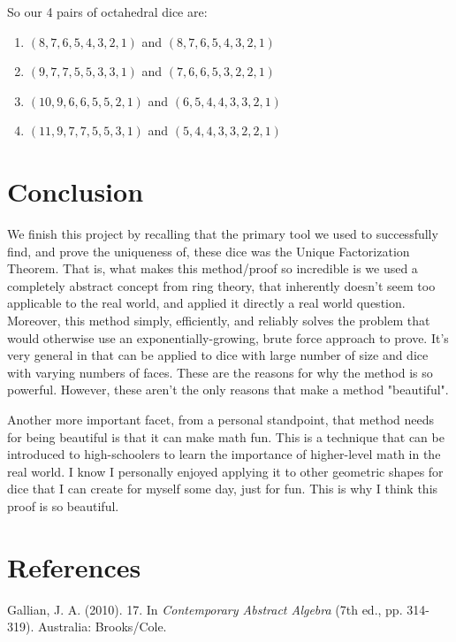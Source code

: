 \documentclass[12pt]{report}
\begin{document}
So our 4 pairs of octahedral dice are:
\begin{enumerate}
\item $(8,7,6,5,4,3,2,1)$ and $(8,7,6,5,4,3,2,1)$
\item $(9,7,7,5,5,3,3,1)$ and $(7,6,6,5,3,2,2,1)$
\item $(10,9,6,6,5,5,2,1)$ and $(6,5,4,4,3,3,2,1)$
\item $(11,9,7,7,5,5,3,1)$ and $(5,4,4,3,3,2,2,1)$
\end{enumerate}

\section*{Conclusion}
We finish this project by recalling that the primary tool we used to successfully find, and prove the
uniqueness of, these dice was the Unique Factorization Theorem. That is, what makes this method/proof so
incredible is we used a completely abstract concept from ring theory, that inherently doesn't seem too
applicable to the real world, and applied it directly a real world question. Moreover, this method simply,
efficiently, and reliably solves the problem that would otherwise use an exponentially-growing, brute force
approach to prove. It's very general in that can be applied to dice with large number of size and dice with
varying numbers of faces. These are the reasons for why the method is so powerful. However, these aren't the
only reasons that make a method "beautiful".

Another more important facet, from a personal standpoint, that method needs for being beautiful is that it can
make math fun. This is a technique that can be introduced to high-schoolers to learn the importance of
higher-level math in the real world. I know I personally enjoyed applying it to other geometric shapes for
dice that I can create for myself some day, just for fun. This is why I think this proof is so beautiful.

\section*{References}
Gallian, J. A. (2010). 17. In \textit{Contemporary Abstract Algebra} (7th ed., pp. 314-319). Australia: Brooks/Cole.
\end{document}
